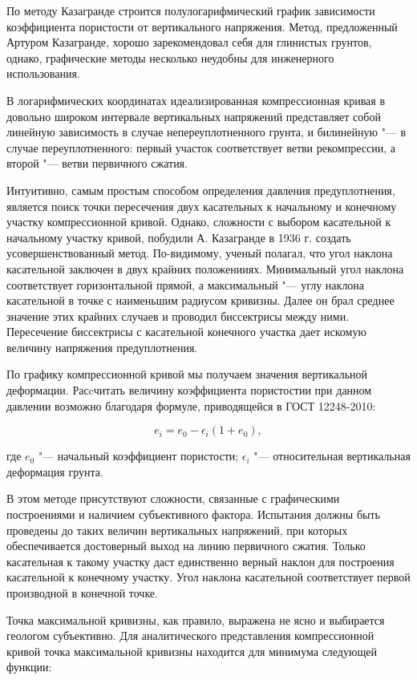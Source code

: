 По методу Казагранде строится полулогарифмический график зависимости коэффициента пористости от вертикального напряжения.  
Метод, предложенный Артуром Казагранде, хорошо зарекомендовал себя для глинистых грунтов, однако, графические методы несколько неудобны для инженерного использования.

В логарифмических координатах идеализированная компрессионная кривая в довольно широком интервале вертикальных напряжений представляет собой линейную зависимость в случае непереуплотненного грунта, и билинейную "--- в случае переуплотненного:
первый участок соответствует ветви рекомпрессии, а второй "--- ветви первичного сжатия.

Интуитивно, самым простым способом определения давления предуплотнения, является поиск точки пересечения двух касательных к начальному и конечному участку компрессионной кривой. 
Однако, сложности с выбором касательной к начальному участку кривой, побудили А. Казагранде в 1936 г. создать усовершенствованный метод. 
По-видимому, ученый полагал, что угол наклона касательной заключен в двух крайних положенииях. 
Минимальный угол наклона соответствует горизонтальной прямой, а максимальный "--- углу наклона касательной в точке с наименьшим радиусом кривизны. 
Далее он брал среднее значение этих крайних случаев и проводил биссектрисы между ними. 
Пересечение биссектрисы с касательной конечного участка дает искомую величину напряжения предуплотнения.

По графику компрессионной кривой мы получаем значения вертикальной деформации. Расcчитать величину коэффициента пористостии при данном давлении возможно благодаря формуле, приводящейся в ГОСТ 12248-2010:

$$e_i = e_0 - \epsilon_i (1+e_0),$$

где $e_0$ "--- начальный коэффициент пористости;
$\epsilon_i$ "--- относительная вертикальная деформация грунта.

В этом методе присутствуют сложности, связанные с графическими построениями и наличием субъективного фактора.
Испытания должны быть проведены до таких величин вертикальных напряжений, при которых обеспечивается достоверный выход на линию первичного сжатия. 
Только касательная к такому участку даст единственно верный наклон для построения касательной к конечному участку.
Угол наклона касательной соответствует первой производной в конечной точке.

Точка максимальной кривизны, как правило, выражена не ясно и выбирается геологом субъективно. Для аналитического представления компрессионной кривой точка максимальной кривизны находится для минимума следующей функции:

